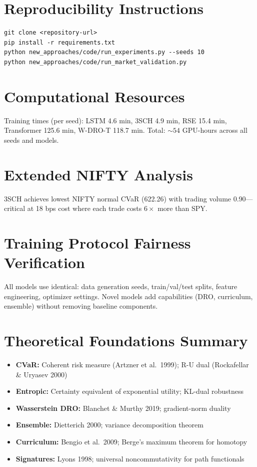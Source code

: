 \documentclass[11pt]{article}
\begin{document}
\section{Reproducibility Instructions}
\begin{verbatim}
git clone <repository-url>
pip install -r requirements.txt
python new_approaches/code/run_experiments.py --seeds 10
python new_approaches/code/run_market_validation.py
\end{verbatim}

\section{Computational Resources}
Training times (per seed): LSTM 4.6 min, 3SCH 4.9 min, RSE 15.4 min, Transformer 125.6 min, W-DRO-T 118.7 min. Total: ${\sim}54$ GPU-hours across all seeds and models.

\section{Extended NIFTY Analysis}
3SCH achieves lowest NIFTY normal CVaR (622.26) with trading volume 0.90---critical at 18 bps cost where each trade costs $6\times$ more than SPY.

\section{Training Protocol Fairness Verification}
All models use identical: data generation seeds, train/val/test splits, feature engineering, optimizer settings. Novel models add capabilities (DRO, curriculum, ensemble) without removing baseline components.

\section{Theoretical Foundations Summary}
\begin{itemize}[noitemsep,leftmargin=*]
\item \textbf{CVaR:} Coherent risk measure (Artzner et al.\ 1999); R-U dual (Rockafellar \& Uryasev 2000)
\item \textbf{Entropic:} Certainty equivalent of exponential utility; KL-dual robustness
\item \textbf{Wasserstein DRO:} Blanchet \& Murthy 2019; gradient-norm duality
\item \textbf{Ensemble:} Dietterich 2000; variance decomposition theorem
\item \textbf{Curriculum:} Bengio et al.\ 2009; Berge's maximum theorem for homotopy
\item \textbf{Signatures:} Lyons 1998; universal noncommutativity for path functionals
\end{itemize}
\end{document}
